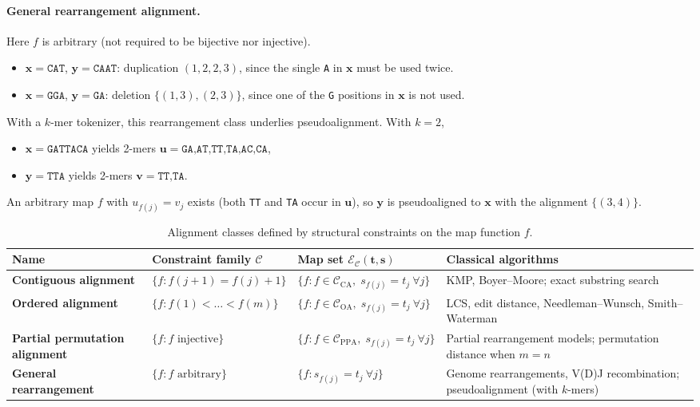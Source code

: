 \paragraph{General rearrangement alignment.}
Here $f$ is arbitrary (not required to be bijective nor injective).
\begin{itemize}
    \item $\mathbf{x}=\texttt{CAT}$, $\mathbf{y}=\texttt{CAAT}$:
    duplication $(1,2,2,3)$, since the single \texttt{A} in $\mathbf{x}$ must
    be used twice.
    \item $\mathbf{x}=\texttt{GGA}$, $\mathbf{y}=\texttt{GA}$:
    deletion $\{(1,3),(2,3)\}$, since one of the \texttt{G} positions in
    $\mathbf{x}$ is not used.
\end{itemize}

With a $k$-mer tokenizer, this rearrangement class underlies
pseudoalignment. With $k{=}2$,
\begin{itemize}
    \item $\mathbf{x}=\texttt{GATTACA}$ yields 2-mers
          $\mathbf{u}=\texttt{GA,AT,TT,TA,AC,CA}$,
    \item $\mathbf{y}=\texttt{TTA}$ yields 2-mers
          $\mathbf{v}=\texttt{TT,TA}$.
\end{itemize}
An arbitrary map $f$ with $u_{f(j)} = v_j$ exists (both \texttt{TT} and \texttt{TA} occur in $\mathbf{u}$), so $\mathbf{y}$ is pseudoaligned to $\mathbf{x}$ with the alignment $\{(3,4)\}$.

\newpage
\begin{table}
\centering
\footnotesize
\setlength{\tabcolsep}{4pt}
\renewcommand{\arraystretch}{1.4}
\caption{Alignment classes defined by structural constraints on the map
function $f$.}
\begin{tabular}{l p{4.0cm} p{5.0cm} p{5.0cm}}
\toprule
\textbf{Name} &
\textbf{Constraint family $\mathcal{C}$} &
\textbf{Map set $\mathcal{E}_{\mathcal{C}}(\mathbf{t},\mathbf{s})$} &
\textbf{Classical algorithms} \\
\midrule

\textbf{Contiguous alignment} &
$\{ f : f(j{+}1)=f(j)+1 \}$ &
$\{ f : f \in \mathcal{C}_{\mathrm{CA}},\; s_{f(j)}=t_j\ \forall j \}$ &
KMP, Boyer--Moore; exact substring search \\
\midrule

\textbf{Ordered alignment} &
$\{ f : f(1)<\dots<f(m) \}$ &
$\{ f : f \in \mathcal{C}_{\mathrm{OA}},\; s_{f(j)}=t_j\ \forall j \}$ &
LCS, edit distance, Needleman--Wunsch, Smith--Waterman \\
\midrule

\textbf{Partial permutation alignment} &
$\{ f : f \text{ injective} \}$ &
$\{ f : f \in \mathcal{C}_{\mathrm{PPA}},\; s_{f(j)} = t_j\ \forall j \}$ &
Partial rearrangement models; permutation distance when $m=n$ \\
\midrule

\textbf{General rearrangement} &
$\{ f : f \text{ arbitrary} \}$ &
$\{ f : s_{f(j)} = t_j\ \forall j \}$ &
Genome rearrangements, V(D)J recombination; pseudoalignment (with $k$-mers) \\
\bottomrule
\end{tabular}
\label{tab:cfam}
\end{table}
